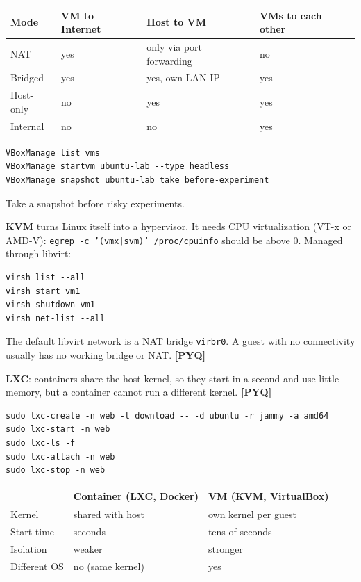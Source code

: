 \documentclass[11pt,a4paper]{article}
\newcommand{\pyq}{\textcolor{ember}{\scriptsize\textbf{[PYQ]}}}
\begin{document}
\begin{center}\small\renewcommand{\arraystretch}{1.18}\setlength{\tabcolsep}{9pt}
\begin{tabularx}{\linewidth}{@{}ll>{\raggedright\arraybackslash}Xl@{}}
\toprule
\textbf{\color{slate}Mode} & \textbf{\color{slate}VM to Internet} & \textbf{\color{slate}Host to VM} & \textbf{\color{slate}VMs to each other} \\ \midrule
NAT & yes & only via port forwarding & no \\
Bridged & yes & yes, own LAN IP & yes \\
Host-only & no & yes & yes \\
Internal & no & no & yes \\
\bottomrule
\end{tabularx}\end{center}
\begin{lstlisting}
VBoxManage list vms
VBoxManage startvm ubuntu-lab --type headless
VBoxManage snapshot ubuntu-lab take before-experiment
\end{lstlisting}
Take a snapshot before risky experiments.

\textbf{KVM} turns Linux itself into a hypervisor. It needs CPU virtualization (VT-x or AMD-V): \texttt{egrep -c '(vmx|svm)' /proc/cpuinfo} should be above 0. Managed through libvirt:

\begin{lstlisting}
virsh list --all
virsh start vm1
virsh shutdown vm1
virsh net-list --all
\end{lstlisting}
The default libvirt network is a NAT bridge \texttt{virbr0}. A guest with no connectivity usually has no working bridge or NAT. \pyq{}

\textbf{LXC}: containers share the host kernel, so they start in a second and use little memory, but a container cannot run a different kernel. \pyq{}

\begin{lstlisting}
sudo lxc-create -n web -t download -- -d ubuntu -r jammy -a amd64
sudo lxc-start -n web
sudo lxc-ls -f
sudo lxc-attach -n web
sudo lxc-stop -n web
\end{lstlisting}
\begin{center}\small\renewcommand{\arraystretch}{1.18}\setlength{\tabcolsep}{9pt}
\begin{tabularx}{\linewidth}{@{}ll>{\raggedright\arraybackslash}X@{}}
\toprule
\textbf{\color{slate}} & \textbf{\color{slate}Container (LXC, Docker)} & \textbf{\color{slate}VM (KVM, VirtualBox)} \\ \midrule
Kernel & shared with host & own kernel per guest \\
Start time & seconds & tens of seconds \\
Isolation & weaker & stronger \\
Different OS & no (same kernel) & yes \\
\bottomrule
\end{tabularx}\end{center}
\end{document}
